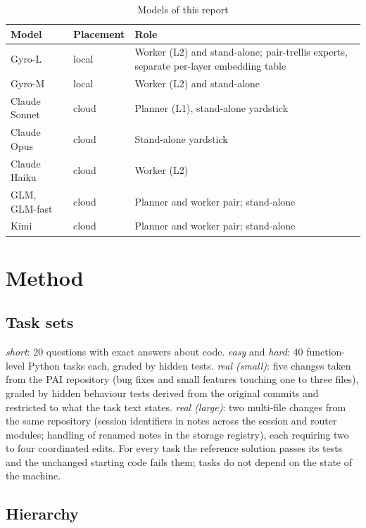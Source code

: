 \begin{table}[htbp]
\centering
\small
\caption{Models of this report}\label{tab:models4}
\begin{tabular}{P{3.6cm}P{2.6cm}P{7.4cm}}
\toprule
Model & Placement & Role \\
\midrule
Gyro-L & local & Worker (L2) and stand-alone; pair-trellis experts, separate per-layer embedding table \\
Gyro-M & local & Worker (L2) and stand-alone \\
Claude Sonnet \citep{Anthropic-2026ab} & cloud & Planner (L1), stand-alone yardstick \\
Claude Opus & cloud & Stand-alone yardstick \\
Claude Haiku & cloud & Worker (L2) \\
GLM, GLM-fast & cloud & Planner and worker pair; stand-alone \\
Kimi & cloud & Planner and worker pair; stand-alone \\
\bottomrule
\end{tabular}
\end{table}

\section{Method}\label{sec:method}

\subsection{Task sets}

\emph{short}: 20 questions with exact answers about code. \emph{easy} and \emph{hard}: 40 function-level Python
tasks each, graded by hidden tests. \emph{real (small)}: five changes taken from the PAI repository (bug fixes and
small features touching one to three files), graded by hidden behaviour tests derived from the original commits and
restricted to what the task text states. \emph{real (large)}: two multi-file changes from the same repository
(session identifiers in notes across the session and router modules; handling of renamed notes in the storage
registry), each requiring two to four coordinated edits. For every task the reference solution passes its tests
and the unchanged starting code fails them; tasks do not depend on the state of the machine.

\subsection{Hierarchy}

